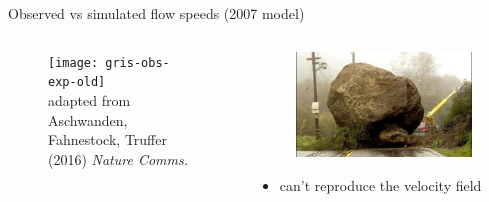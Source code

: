 \documentclass[hide notes,intlimits]{beamer}
\begin{document}
\begin{frame}{Observed vs simulated flow speeds (2007 model)}
  \begin{columns}[c]
    \begin{column}{.6\linewidth}
    \begin{figure}
      \texttt{[image: gris-obs-exp-old]}
      \\ \tiny{adapted from Aschwanden, Fahnestock, Truffer (2016) \textit{Nature Comms.}}
    \end{figure}
    \end{column}
    \begin{column}{.4\linewidth}
      \begin{figure}
        \includegraphics[width=\textwidth]{roadblocks}
      \end{figure}
      \begin{itemize}
      \item can't reproduce the velocity field
      \end{itemize}
    \end{column}
  \end{columns}
  \note[item]{}
\end{frame}
\end{document}
